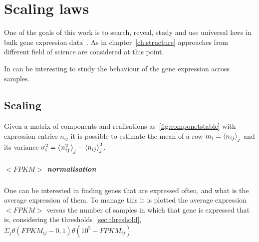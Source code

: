 \chapter{Scaling laws}\label{ch:scalinglaws}
One of the goals of this work is to search, reveal, study and use universal laws in bulk gene expression data~\nocite{altmann2016statistical}.
As in chapter~\ref{ch:structure} approaches from different field of science are considered at this point.

In can be interesting to study the behaviour of the gene expression across samples.

\section{Scaling}

Given a matrix of components and realisations as~\ref{fig:componetstable} with expression entries $n_{i j}$ it is possible to estimate the mean of a row $m_i=\left\langle n_{i j}\right\rangle_j$ and its variance $\sigma^2_{i}=\left\langle n_{i j}^2\right\rangle_j - \left\langle n_{i j}\right\rangle^2_j$.



\paragraph{$<FPKM>$ normalisation}
One can be interested in finding genes that are expressed often, and what is the 
average expression of them.
To manage this it is plotted the average expression $<FPKM>$ versus the number 
of samples in which that gene is expressed that is, considering the thresholds~\ref{sec:threshold}, 
$\Sigma_j\theta (FPKM_{ij}-0,1)\theta (10^5-FPKM_{ij})$

